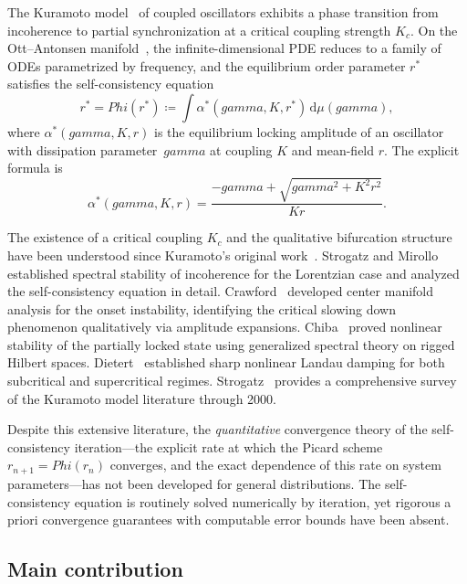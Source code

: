 \documentclass[11pt,a4paper]{article}
\let\Phi\relax\def\Phi{Phi}%
\let\gamma\relax\def\gamma{gamma}%
\theoremstyle{definition}
\begin{document}
The Kuramoto model~\cite{kuramoto1975,kuramoto1984} of coupled oscillators exhibits a phase transition from incoherence to partial synchronization at a critical coupling strength $K_c$. On the Ott--Antonsen manifold~\cite{ott-antonsen2008}, the infinite-dimensional PDE reduces to a family of ODEs parametrized by frequency, and the equilibrium order parameter $r^*$ satisfies the self-consistency equation
\begin{equation}\label{eq:sc}
r^* = \Phi(r^*) \coloneqq \int \alpha^*(\gamma, K, r^*)\,\mathrm{d}\mu(\gamma),
\end{equation}
where $\alpha^*(\gamma, K, r)$ is the equilibrium locking amplitude of an oscillator with dissipation parameter~$\gamma$ at coupling $K$ and mean-field $r$. The explicit formula is
\begin{equation}\label{eq:equil}
\alpha^*(\gamma, K, r) = \frac{-\gamma + \sqrt{\gamma^2 + K^2 r^2}}{Kr}.
\end{equation}

The existence of a critical coupling $K_c$ and the qualitative bifurcation structure have been understood since Kuramoto's original work~\cite{kuramoto1975}. Strogatz and Mirollo~\cite{strogatz-mirollo1991} established spectral stability of incoherence for the Lorentzian case and analyzed the self-consistency equation in detail. Crawford~\cite{crawford1994,crawford1995} developed center manifold analysis for the onset instability, identifying the critical slowing down phenomenon qualitatively via amplitude expansions. Chiba~\cite{chiba2015} proved nonlinear stability of the partially locked state using generalized spectral theory on rigged Hilbert spaces. Dietert~\cite{dietert2016} established sharp nonlinear Landau damping for both subcritical and supercritical regimes. Strogatz~\cite{strogatz2000} provides a comprehensive survey of the Kuramoto model literature through 2000.

Despite this extensive literature, the \emph{quantitative} convergence theory of the self-consistency iteration---the explicit rate at which the Picard scheme $r_{n+1} = \Phi(r_n)$ converges, and the exact dependence of this rate on system parameters---has not been developed for general distributions. The self-consistency equation is routinely solved numerically by iteration, yet rigorous a priori convergence guarantees with computable error bounds have been absent.

\subsection{Main contribution}
\end{document}
